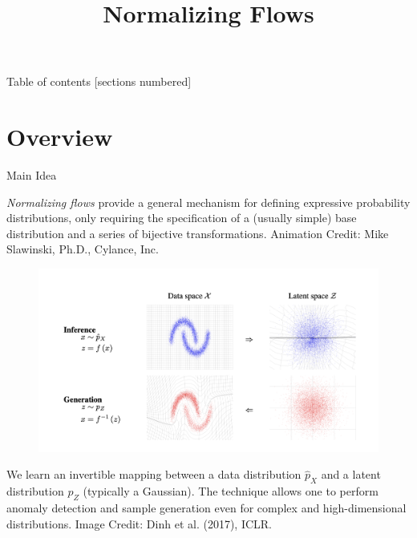 \documentclass[10pt]{beamer}
\title{Normalizing Flows}
\begin{document}
\maketitle

\begin{frame}{Table of contents}
  [sections numbered]
  \tableofcontents[hideallsubsections]
\end{frame}

\section{Overview}
 
\begin{frame}{Main Idea}

\scriptsize
\textit{Normalizing flows} provide a general mechanism for defining expressive probability distributions, only requiring the specification of a (usually simple) base distribution and a series of
bijective transformations.
\vfill
\tiny \hfill Animation Credit: Mike Slawinski, Ph.D., Cylance, Inc.
\end{frame}
    
\begin{frame}{}

\begin{figure}[H]
\includegraphics[width=\textwidth]{images/nf_idea}
\end{figure} 
We learn an invertible mapping between a data distribution $\widehat{p}_X$ and a latent distribution $p_Z$ (typically a Gaussian).  The technique allows one to perform anomaly detection and sample generation even for complex and high-dimensional distributions.
\vfill
\tiny \hfill Image Credit: Dinh et al. (2017), ICLR. 
 \end{frame}
\end{document}
